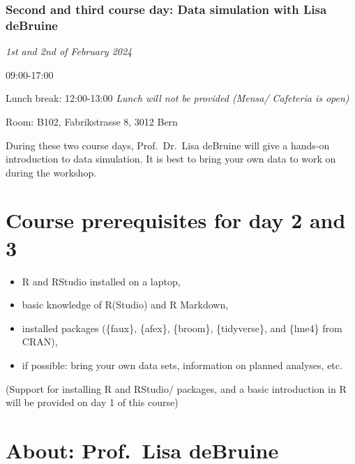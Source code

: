 \documentclass[
  letterpaper,
  DIV=11,
  numbers=noendperiod]{scrreprt}
\begin{document}
\hypertarget{second-and-third-course-day-data-simulation-with-lisa-debruine}{%
\subsubsection*{Second and third course day: Data simulation with Lisa
deBruine}\label{second-and-third-course-day-data-simulation-with-lisa-debruine}}

\emph{1st and 2nd of February 2024}

09:00-17:00

Lunch break: 12:00-13:00 \emph{Lunch will not be provided (Mensa/
Cafeteria is open)}

Room: B102, Fabrikstrasse 8, 3012 Bern

During these two course days, Prof.~Dr.~Lisa deBruine will give a
hands-on introduction to data simulation. It is best to bring your own
data to work on during the workshop.

\hypertarget{course-prerequisites-for-day-2-and-3}{%
\section*{Course prerequisites for day 2 and
3}\label{course-prerequisites-for-day-2-and-3}}


\begin{itemize}
\item
  R and RStudio installed on a laptop,
\item
  basic knowledge of R(Studio) and R Markdown,
\item
  installed packages (\{faux\}, \{afex\}, \{broom\}, \{tidyverse\}, and
  \{lme4\} from CRAN),
\item
  if possible: bring your own data sets, information on planned
  analyses, etc.
\end{itemize}

(Support for installing R and RStudio/ packages, and a basic
introduction in R will be provided on day 1 of this course)

\hypertarget{about-prof.-lisa-debruine}{%
\section*{About: Prof.~Lisa deBruine}\label{about-prof.-lisa-debruine}}
\end{document}
